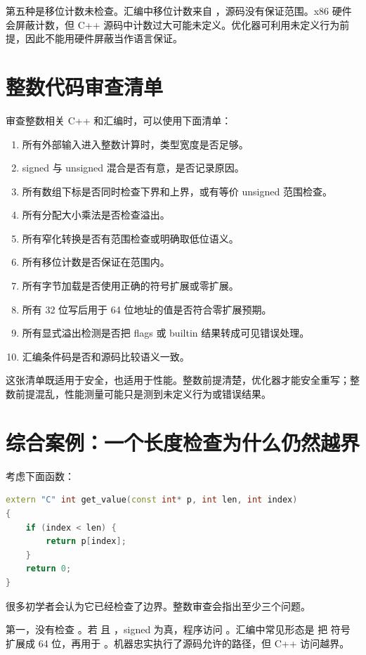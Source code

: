第五种是移位计数未检查。汇编中移位计数来自 ，源码没有保证范围。x86 硬件会屏蔽计数，但 C++ 源码中计数过大可能未定义。优化器可利用未定义行为前提，因此不能用硬件屏蔽当作语言保证。

\section{整数代码审查清单}

审查整数相关 C++ 和汇编时，可以使用下面清单：

\begin{enumerate}
  \item 所有外部输入进入整数计算时，类型宽度是否足够。
  \item signed 与 unsigned 混合是否有意，是否记录原因。
  \item 所有数组下标是否同时检查下界和上界，或有等价 unsigned 范围检查。
  \item 所有分配大小乘法是否检查溢出。
  \item 所有窄化转换是否有范围检查或明确取低位语义。
  \item 所有移位计数是否保证在范围内。
  \item 所有字节加载是否使用正确的符号扩展或零扩展。
  \item 所有 32 位写后用于 64 位地址的值是否符合零扩展预期。
  \item 所有显式溢出检测是否把 flags 或 builtin 结果转成可见错误处理。
  \item 汇编条件码是否和源码比较语义一致。
\end{enumerate}

这张清单既适用于安全，也适用于性能。整数前提清楚，优化器才能安全重写；整数前提混乱，性能测量可能只是测到未定义行为或错误结果。

\section{综合案例：一个长度检查为什么仍然越界}

考虑下面函数：

\begin{lstlisting}[language=C++]
extern "C" int get_value(const int* p, int len, int index)
{
    if (index < len) {
        return p[index];
    }
    return 0;
}
\end{lstlisting}

很多初学者会认为它已经检查了边界。整数审查会指出至少三个问题。

第一，没有检查 。若  且 ，signed  为真，程序访问 。汇编中常见形态是  把  符号扩展成 64 位，再用于 。机器忠实执行了源码允许的路径，但 C++ 访问越界。

